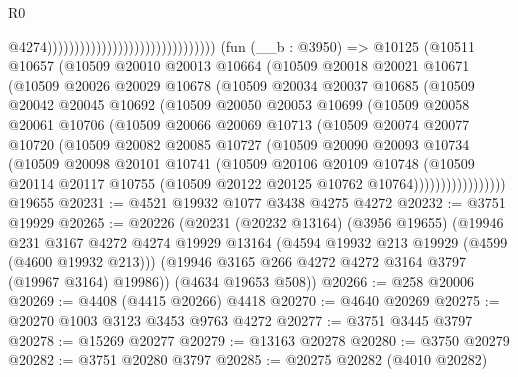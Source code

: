 \begin{lexlean}{R0}
\begin{coremodule}
                                                                  @4274)))))))))))))))))))))))))))))))
    (fun (__b : @3950) =>
    @10125
      (@10511
        @10657
        (@10509
          @20010
          @20013
          @10664
          (@10509
            @20018
            @20021
            @10671
            (@10509
              @20026
              @20029
              @10678
              (@10509
                @20034
                @20037
                @10685
                (@10509
                  @20042
                  @20045
                  @10692
                  (@10509
                    @20050
                    @20053
                    @10699
                    (@10509
                      @20058
                      @20061
                      @10706
                      (@10509
                        @20066
                        @20069
                        @10713
                        (@10509
                          @20074
                          @20077
                          @10720
                          (@10509
                            @20082
                            @20085
                            @10727
                            (@10509
                              @20090
                              @20093
                              @10734
                              (@10509
                                @20098
                                @20101
                                @10741
                                (@10509
                                  @20106
                                  @20109
                                  @10748
                                  (@10509
                                    @20114
                                    @20117
                                    @10755
                                    (@10509 @20122 @20125 @10762 @10764)))))))))))))))))
    @19655
@20231 := @4521 @19932 @1077 @3438 @4275 @4272
@20232 := @3751 @19929
@20265 := @20226
    (@20231
      (@20232 @13164)
      (@3956 @19655)
      (@19946
        @231
        @3167
        @4272
        @4274
        @19929
        @13164
        (@4594 @19932 @213 @19929 (@4599 (@4600 @19932 @213)))
        (@19946 @3165 @266 @4272 @4272 @3164 @3797 (@19967 @3164) @19986))
      (@4634 @19653 @508))
@20266 := @258 @20006
@20269 := @4408 (@4415 @20266) @4418
@20270 := @4640 @20269
@20275 := @20270 @1003 @3123 @3453 @9763 @4272
@20277 := @3751 @3445 @3797
@20278 := @15269 @20277
@20279 := @13163 @20278
@20280 := @3750 @20279
@20282 := @3751 @20280 @3797
@20285 := @20275 @20282 (@4010 @20282)

\end{coremodule}
\end{lexlean}
